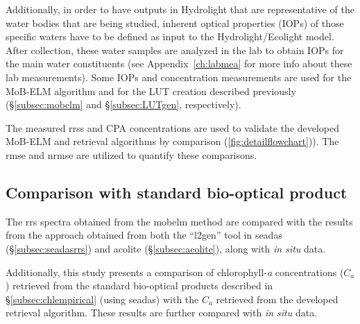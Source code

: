 Additionally, in order to have outputs in Hydrolight that are representative of the water bodies that are being studied, inherent optical properties (IOPs) of those specific waters have to be defined as input to the Hydrolight/Ecolight model. After collection, these water samples are analyzed in the lab to obtain IOPs for the main water constituents (see Appendix~\ref{ch:labmea} for more info about these lab measurements). Some IOPs and concentration measurements are used for the MoB-ELM algorithm and for the LUT creation described previously (\S\ref{subsec:mobelm} and \S\ref{subsec:LUTgen}, respectively). 

The measured \gls{rrs}s and CPA concentrations are used to validate the developed MoB-ELM and retrieval algorithms by comparison (\autoref{fig:detailflowchart})). The \acrfull{rmse} and \acrfull{nrmse} are utilized to quantify these comparisons.


\subsection{Comparison with standard bio-optical product}
The \gls{rrs} spectra obtained from the \gls{mobelm} method are compared with the results from the \citet{Gordon:1994} approach obtained from both the ``l2gen'' tool in \gls{seadas} (\S\ref{subsec:seadasrrs}) and \gls{acolite} (\S\ref{subsec:acolite}), along with {\it in situ} data.

Additionally, this study presents a comparison of chlorophyll-{\it a} concentrations ($C_a$) retrieved from the standard bio-optical products described in \S\ref{subsec:chlempirical} (using \gls{seadas}) with the $C_a$ retrieved from the developed retrieval algorithm. These results are further compared with {\it in situ} data.


